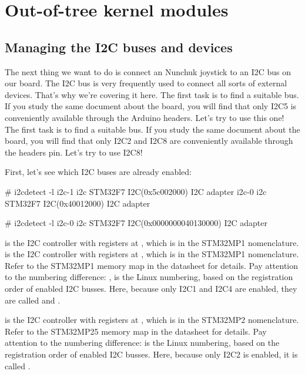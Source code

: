 \section{Out-of-tree kernel modules}

\subsection{Managing the I2C buses and devices}

The next thing we want to do is connect an Nunchuk joystick
to an I2C bus on our board. The I2C bus is very frequently used
to connect all sorts of external devices. That's why we're covering
it here.
\if{}
The first task is to find a suitable bus. If you study the
same document about the board, you will find that only I2C5 is
conveniently available through the Arduino headers. Let's try
to use this one!
\fi
\if{}
The first task is to find a suitable bus. If you study the
same document about the board, you will find that only I2C2 and I2C8 are
conveniently available through the headers pin. Let's try
to use I2C8!
\fi

First, let's see which I2C buses are already enabled:

\if{}
\begin{bashinput}
# i2cdetect -l
i2c-1	i2c             STM32F7 I2C(0x5c002000)                 I2C adapter
i2c-0	i2c             STM32F7 I2C(0x40012000)                 I2C adapter
\end{bashinput}
\fi
\if{}
\begin{bashinput}
# i2cdetect -l
i2c-0	i2c       	STM32F7 I2C(0x0000000040130000) 	I2C adapter
\end{bashinput}
\fi

\if{}
 is the I2C controller with registers at
, which is  in the STM32MP1
nomenclature.  is the I2C controller with registers at
, which is  in the STM32MP1
nomenclature. Refer to the STM32MP1 memory map in the datasheet for
details. Pay attention to the numbering difference: ,
 is the Linux numbering, based on the registration order
of enabled I2C busses. Here, because only I2C1 and I2C4 are enabled,
they are called  and .
\fi

\if{}
 is the I2C controller with registers at
, which is  in the STM32MP2
nomenclature. Refer to the STM32MP25 memory map in the datasheet for
details. Pay attention to the numbering difference:  is
the Linux numbering, based on the registration order of enabled I2C
busses. Here, because only I2C2 is enabled, it is called .
\fi

